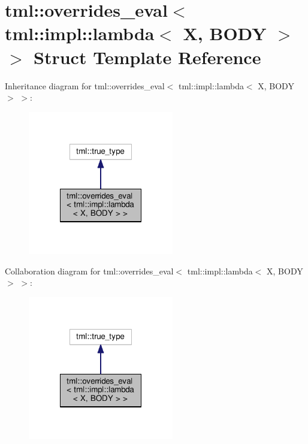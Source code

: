 \hypertarget{structtml_1_1overrides__eval_3_01tml_1_1impl_1_1lambda_3_01_x_00_01_b_o_d_y_01_4_01_4}{\section{tml\+:\+:overrides\+\_\+eval$<$ tml\+:\+:impl\+:\+:lambda$<$ X, B\+O\+D\+Y $>$ $>$ Struct Template Reference}
\label{structtml_1_1overrides__eval_3_01tml_1_1impl_1_1lambda_3_01_x_00_01_b_o_d_y_01_4_01_4}
}


Inheritance diagram for tml\+:\+:overrides\+\_\+eval$<$ tml\+:\+:impl\+:\+:lambda$<$ X, B\+O\+D\+Y $>$ $>$\+:
\nopagebreak
\begin{figure}[H]
\begin{center}
\leavevmode
\includegraphics[width=180pt]{structtml_1_1overrides__eval_3_01tml_1_1impl_1_1lambda_3_01_x_00_01_b_o_d_y_01_4_01_4__inherit__graph}
\end{center}
\end{figure}


Collaboration diagram for tml\+:\+:overrides\+\_\+eval$<$ tml\+:\+:impl\+:\+:lambda$<$ X, B\+O\+D\+Y $>$ $>$\+:
\nopagebreak
\begin{figure}[H]
\begin{center}
\leavevmode
\includegraphics[width=180pt]{structtml_1_1overrides__eval_3_01tml_1_1impl_1_1lambda_3_01_x_00_01_b_o_d_y_01_4_01_4__coll__graph}
\end{center}
\end{figure}


